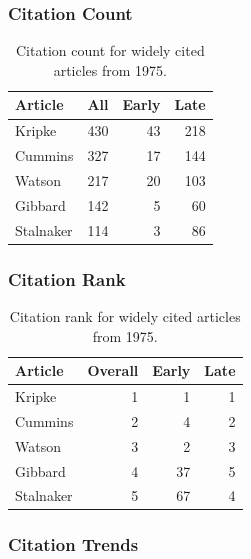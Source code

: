 \documentclass[
  10pt,
  letterpaper,
  DIV=11,
  numbers=noendperiod,
  twoside]{scrartcl}
\begin{document}
\subsubsection*{Citation Count}\label{sec-count-1975}

\begin{longtable}[]{@{}lrrr@{}}

\caption{\label{tbl-citation-count-1975}Citation count for widely cited
articles from 1975.}

\tabularnewline

\toprule\noalign{}
Article & All & Early & Late \\
\midrule\noalign{}
\endhead
\bottomrule\noalign{}
\endlastfoot
Kripke & 430 & 43 & 218 \\
Cummins & 327 & 17 & 144 \\
Watson & 217 & 20 & 103 \\
Gibbard & 142 & 5 & 60 \\
Stalnaker & 114 & 3 & 86 \\

\end{longtable}

\subsubsection*{Citation Rank}\label{sec-rank-1975}

\begin{longtable}[]{@{}lrrr@{}}

\caption{\label{tbl-citation-rank-1975}Citation rank for widely cited
articles from 1975.}

\tabularnewline

\toprule\noalign{}
Article & Overall & Early & Late \\
\midrule\noalign{}
\endhead
\bottomrule\noalign{}
\endlastfoot
Kripke & 1 & 1 & 1 \\
Cummins & 2 & 4 & 2 \\
Watson & 3 & 2 & 3 \\
Gibbard & 4 & 37 & 5 \\
Stalnaker & 5 & 67 & 4 \\

\end{longtable}

\subsubsection*{Citation Trends}\label{sec-trends-1975}
\end{document}
